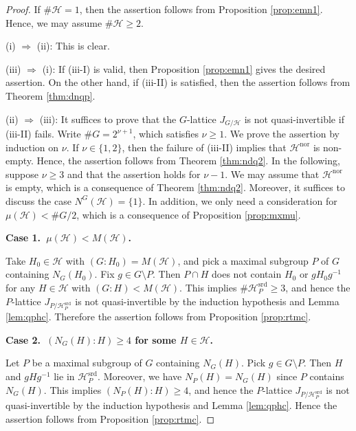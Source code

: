 \documentclass[12pt]{amsart}
\theoremstyle{plain}
\theoremstyle{definition}
\numberwithin{thm}{section}
\numberwithin{equation}{section}
\newcommand{\cH}{\mathcal{H}}
\DeclareMathOperator{\nor}{nor}
\DeclareMathOperator{\srd}{srd}
\begin{document}
\begin{proof}
If $\#\cH=1$, then the assertion follows from Proposition \ref{prop:emn1}. Hence, we may assume $\#\cH\geq 2$. 

(i) $\Rightarrow$ (ii): This is clear. 

(iii) $\Rightarrow$ (i): If (iii-I) is valid, then Proposition \ref{prop:emn1} gives the desired assertion. On the other hand, if (iii-I\hspace{-1pt}I) is satisfied, then the assertion follows from Theorem \ref{thm:dnqp}. 

(ii) $\Rightarrow$ (iii): It suffices to prove that the $G$-lattice $J_{G/\cH}$ is not quasi-invertible if (iii-I\hspace{-1pt}I) fails. Write $\#G=2^{\nu+1}$, which satisfies $\nu \geq 1$. We prove the assertion by induction on $\nu$. If $\nu \in \{1,2\}$, then the failure of (iii-I\hspace{-1pt}I) implies that $\cH^{\nor}$ is non-empty. Hence, the assertion follows from Theorem \ref{thm:ndq2}. In the following, suppose $\nu \geq 3$ and that the assertion holds for $\nu-1$. We may assume that $\cH^{\nor}$ is empty, which is a consequence of Theorem \ref{thm:ndq2}. Moreover, it suffices to discuss the case $N^{G}(\cH)=\{1\}$. In addition, we only need a consideration for $\mu(\cH)<\#G/2$, which is a consequence of Proposition \ref{prop:mxmu}. 

\textbf{Case 1.~$\mu(\cH)<M(\cH)$. }

Take $H_{0}\in \cH$ with $(G:H_{0})=M(\cH)$, and pick a maximal subgroup $P$ of $G$ containing $N_{G}(H_{0})$. Fix $g\in G\setminus P$. Then $P\cap H$ does not contain $H_{0}$ or $gH_{0}g^{-1}$ for any $H\in \cH$ with $(G:H)<M(\cH)$. This implies $\#\cH_{P}^{\srd}\geq 3$, and hence the $P$-lattice $J_{P/\cH_{P}^{\srd}}$ is not quasi-invertible by the induction hypothesis and Lemma \ref{lem:qphc}. Therefore the assertion follows from Proposition \ref{prop:rtmc}. 

\textbf{Case 2.~$(N_{G}(H):H)\geq 4$ for some $H\in \cH$. }

Let $P$ be a maximal subgroup of $G$ containing $N_{G}(H)$. Pick $g\in G\setminus P$. Then $H$ and $gHg^{-1}$ lie in $\cH_{P}^{\srd}$. Moreover, we have $N_{P}(H)=N_{G}(H)$ since $P$ contains $N_{G}(H)$. This implies $(N_{P}(H):H)\geq 4$, and hence the $P$-lattice $J_{P/\cH_{P}^{\srd}}$ is not quasi-invertible by the induction hypothesis and Lemma \ref{lem:qphc}. Hence the assertion follows from Proposition \ref{prop:rtmc}. 


\end{proof}
\end{document}
